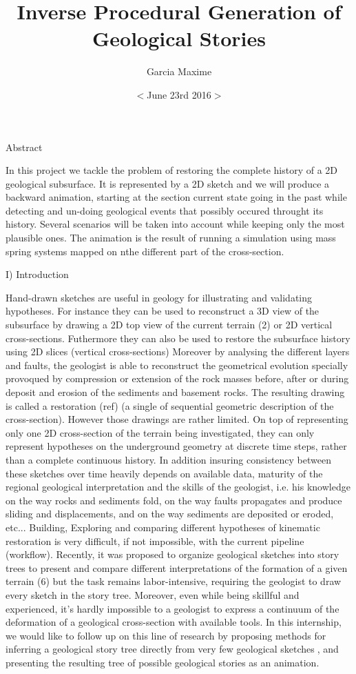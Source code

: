 \documentclass[12pt, a4paper]{memoir} %
\title{ Inverse Procedural Generation of Geological Stories}%
\author{Garcia Maxime}
\date{ $<$June 23rd 2016$>$} %
\begin{document}
\frontmatter
\begin{titlingpage}
\maketitle
\end{titlingpage}

Abstract

In this project we tackle the problem of restoring the complete history of a 2D geological 
subsurface. It is represented by a 2D sketch and we will produce a backward animation, starting
at the section current state going in the past while detecting and un-doing geological events
that possibly occured throught its history. Several scenarios will be taken into account while keeping
only the most plausible ones. The animation is the result of running a simulation using mass spring
systems mapped on nthe different part of the cross-section.

I) Introduction

Hand-drawn sketches are useful in geology for illustrating and validating hypotheses. 
For instance they can be used to reconstruct a 3D view of the subsurface by drawing a 2D top view of the current terrain (2) or 2D vertical cross-sections. 
Futhermore they can also be used to restore the subsurface history using 2D slices (vertical cross-sections) Moreover by analysing the different layers and faults, the geologist is able to reconstruct the geometrical evolution specially provoqued by compression or extension of the rock masses before, after or during deposit and erosion of the sediments and basement rocks. 
The resulting drawing is called a restoration (ref) (a single of sequential geometric description of the cross-section).
However those drawings are rather limited. On top of representing only one 2D cross-section of the terrain being investigated, they can only represent hypotheses on the underground geometry at discrete time steps, rather than a complete continuous history. In addition insuring consistency between these sketches over time heavily depends on available data, maturity of the regional geological interpretation and the skills of the geologist, i.e. his knowledge on the way rocks and sediments fold, on the way faults propagates and produce sliding and displacements, and on the way sediments are deposited or eroded, etc...
Building, Exploring and comparing different hypotheses of kinematic restoration is very difficult, if not impossible, with the current pipeline (workflow). 
Recently, it was proposed to organize geological sketches into story trees to present and compare different interpretations of the formation of a given terrain (6) but the task remains labor-intensive, requiring the geologist to draw every sketch in the story tree. Moreover, even while being skillful and experienced, it’s hardly impossible to a geologist to express a continuum of the deformation of a geological cross-section with available tools.
In this internship, we would like to follow up on this line of research by proposing methods for inferring a geological story tree directly from very few geological sketches, and presenting the resulting tree of possible geological stories as an animation.
\end{document}
